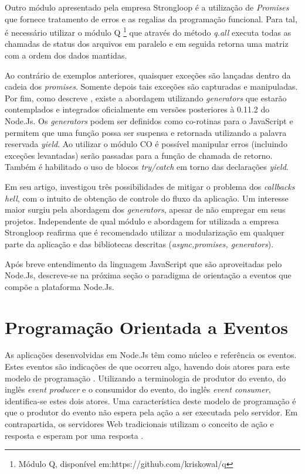   Outro módulo apresentado pela empresa Strongloop é a utilização de \textit{Promises} que fornece tratamento de erros
  e as regalias da programação funcional. Para tal, é necessário utilizar o módulo Q \footnote{Módulo Q, disponível em:https://github.com/kriskowal/q}
  que através do método \textit{q.all} executa todas as chamadas de status dos arquivos em paralelo e em seguida retorna uma matriz
  com a ordem dos dados mantidas. 
  
  Ao contrário de exemplos anteriores, quaisquer exceções são lançadas dentro da cadeia dos
  \textit{promises}. Somente depois tais exceções são capturadas e manipuladas.
  Por fim, como descreve , existe a abordagem utilizando \textit{generators} que estarão
  contemplados e integrados oficialmente em versões posteriores à 0.11.2 do Node.Js. Os \textit{generators} podem ser definidos
  como co-rotinas para o JavaScript e permitem que uma função possa ser suspensa e retornada
  utilizando a palavra reservada \textit{yield}. Ao utilizar o módulo CO é possível manipular erros (incluindo exceções levantadas)
  serão passadas para a função de chamada de retorno. Também é habilitado o uso de blocos \textit{try/catch} em torno das 
  declarações \textit{yield}.
  
  Em seu artigo,  investigou três possibilidades de mitigar o problema dos \textit{callbacks hell}, com o 
  intuito de obtenção de controle do fluxo da aplicação. Um interesse maior surgiu pela abordagem dos \textit{generators},
  apesar de não empregar em seus projetos. Independente de qual módulo e abordagem for utilizada a empresa Strongloop reafirma que é recomendado
  utilizar a modularização em qualquer parte da aplicação e das bibliotecas descritas (\textit{async,promises, generators}).
  
  Após breve entendimento da linguagem JavaScript que são aproveitadas pelo Node.Js, descreve-se na próxima seção
  o paradigma de orientação a eventos que compõe a plataforma Node.Js.
  
  
\section{Programação Orientada a Eventos}
\label{programacao-orientada-a-eventos}

  
  As aplicações desenvolvidas em Node.Js têm como núcleo e referência os eventos. Estes eventos são indicações de que ocorreu algo, 
  havendo dois atores para este modelo de programação \cite{oliveira}. Utilizando a terminologia de produtor do evento, 
  do inglês \textit{event producer} e o consumidor do evento, do inglês \textit{event consumer}, identifica-se estes dois atores. 
  Uma característica deste modelo de programação é que o produtor do evento não espera pela ação a ser executada  pelo servidor. 
  Em contrapartida, os servidores Web tradicionais utilizam o conceito de ação e resposta e esperam por uma resposta \cite{junior}.
  
